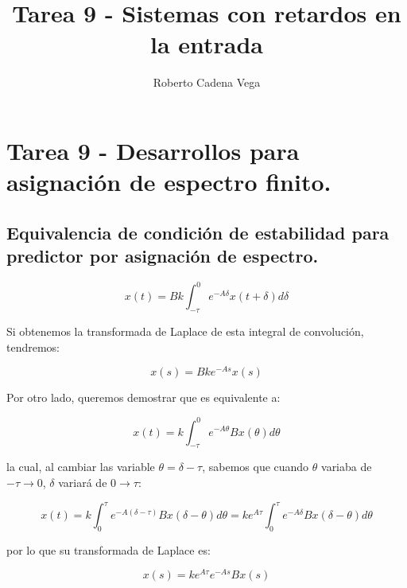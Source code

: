 

\author{Roberto Cadena Vega}
\title{Tarea 9 - Sistemas con retardos en la entrada}


    \maketitle

    \section*{Tarea 9 - Desarrollos para asignación de espectro finito.}

        \subsection*{Equivalencia de condición de estabilidad para predictor por asignación de espectro\cite{kailath1980linear}.}

        \begin{equation}
            x(t) = B k \int_{- \tau}^0 e^{-A \delta} x(t + \delta) d \delta
        \end{equation}

        Si obtenemos la transformada de Laplace de esta integral de convolución, tendremos:

        \begin{equation*}
            x(s) = B k e^{-As} x(s)
        \end{equation*}

        Por otro lado, queremos demostrar que es equivalente a:

        \begin{equation}
            x(t) = k \int_{- \tau}^0 e^{-A \theta} B x(\theta) d \theta
        \end{equation}

        la cual, al cambiar las variable $\theta = \delta - \tau$, sabemos que cuando $\theta$ variaba de $-\tau \to 0$, $\delta$ variará de $0 \to \tau$:

        \begin{equation*}
            x(t) = k \int_{0}^{\tau} e^{-A (\delta - \tau)} B x(\delta - \theta) d \theta = k e^{A \tau} \int_{0}^{\tau} e^{-A \delta} B x(\delta - \theta) d \theta
        \end{equation*}

        por lo que su transformada de Laplace es:

        \begin{equation*}
            x(s) = k e^{A \tau} e^{-A s} B x(s)
        \end{equation*}

